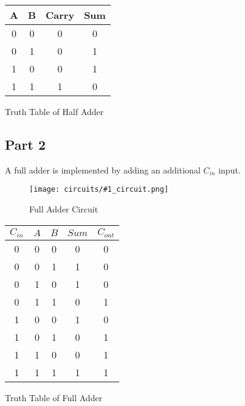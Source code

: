 \documentclass[pdftex,12pt,a4paper]{article}
\theoremstyle{plain}
\newcommand{\circuit}[1]{
    \begin{figure}[H]
    	\centering
    	\texttt{[image: circuits/\#1\_circuit.png]}
    	\caption{#1 Circuit}
    	\label{fig7}
    \end{figure}
    \vspace{1cm}
}
\begin{document}
        \begin{center}
            \begin{tabular}{c c | c c}
                A & B & Carry & Sum \\
                \hline 
                0 & 0 & 0 & 0 \\
                0 & 1 & 0 & 1 \\
                1 & 0 & 0 & 1 \\
                1 & 1 & 1 & 0 \\
            \end{tabular}
        \end{center}
        {\centering Truth Table of Half Adder\\}

    \newpage
    \subsection{Part 2}
        A full adder is implemented by adding an additional $C_{in}$ input.
        \circuit{Full Adder}

        \begin{center}
            \begin{tabular}{c c c | c c}
                $C_{in}$ & $A$ & $B$ & $Sum$ & $C_{out}$ \\
                \hline 
                0 & 0 & 0 & 0 & 0\\
                0 & 0 & 1 & 1 & 0\\
                0 & 1 & 0 & 1 & 0\\
                0 & 1 & 1 & 0 & 1\\
                1 & 0 & 0 & 1 & 0\\
                1 & 0 & 1 & 0 & 1\\
                1 & 1 & 0 & 0 & 1\\
                1 & 1 & 1 & 1 & 1\\
            \end{tabular}
        \end{center}
        {\centering Truth Table of Full Adder\\}
        
    \newpage
\end{document}
